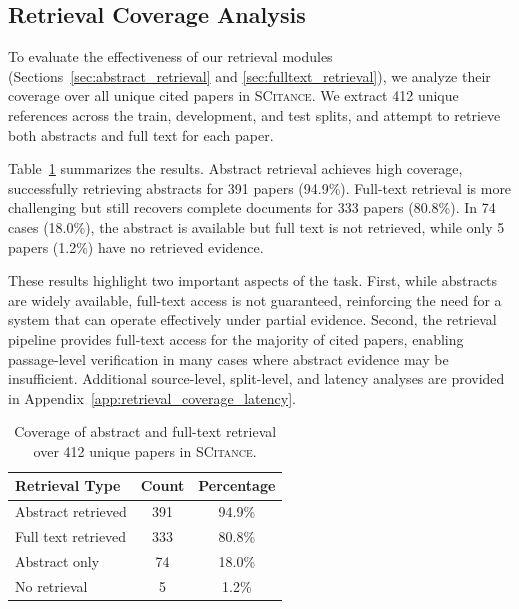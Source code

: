 \documentclass{article}
\theoremstyle{plain}
\theoremstyle{definition}
\theoremstyle{remark}
\begin{document}
\subsection{Retrieval Coverage Analysis}
\label{sec:retrieval_analysis}

To evaluate the effectiveness of our retrieval modules (Sections~\ref{sec:abstract_retrieval} and \ref{sec:fulltext_retrieval}), we analyze their coverage over all unique cited papers in \textsc{SCitance}. We extract 412 unique references across the train, development, and test splits, and attempt to retrieve both abstracts and full text for each paper.

Table~\ref{tab:retrieval_coverage} summarizes the results. Abstract retrieval achieves high coverage, successfully retrieving abstracts for 391 papers (94.9\%). Full-text retrieval is more challenging but still recovers complete documents for 333 papers (80.8\%). In 74 cases (18.0\%), the abstract is available but full text is not retrieved, while only 5 papers (1.2\%) have no retrieved evidence.

These results highlight two important aspects of the task. First, while abstracts are widely available, full-text access is not guaranteed, reinforcing the need for a system that can operate effectively under partial evidence. Second, the retrieval pipeline provides full-text access for the majority of cited papers, enabling passage-level verification in many cases where abstract evidence may be insufficient. Additional source-level, split-level, and latency analyses are provided in Appendix~\ref{app:retrieval_coverage_latency}.

\begin{table}[t]
\centering
\small
\caption{Coverage of abstract and full-text retrieval over 412 unique papers in \textsc{SCitance}.}
\label{tab:retrieval_coverage}

\begin{tabularx}{\columnwidth}{>{\raggedright\arraybackslash}Xcc}
\toprule
\textbf{Retrieval Type} & \textbf{Count} & \textbf{Percentage} \\
\midrule
Abstract retrieved  & 391 & 94.9\% \\
Full text retrieved & 333 & 80.8\% \\
Abstract only       & 74  & 18.0\% \\
No retrieval        & 5   & 1.2\% \\
\bottomrule
\end{tabularx}

\end{table}
\end{document}

